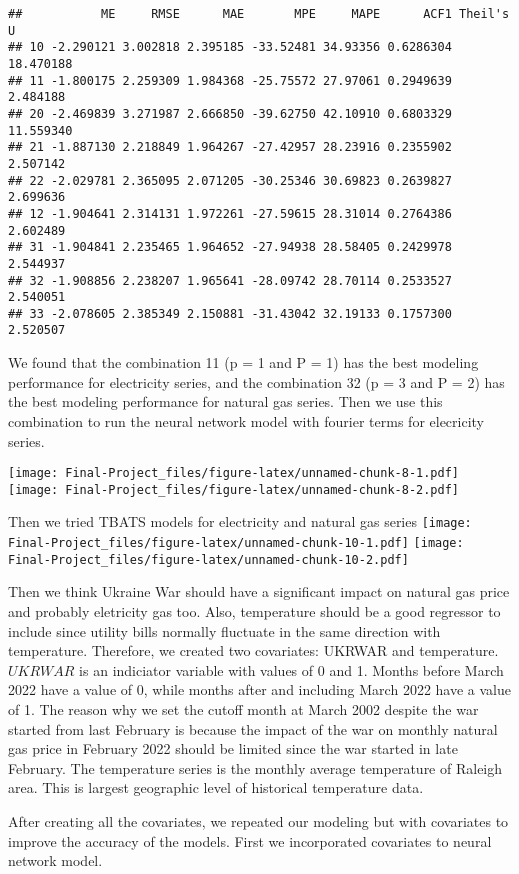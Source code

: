\documentclass[
]{article}
\begin{document}
\begin{verbatim}
##           ME     RMSE      MAE       MPE     MAPE      ACF1 Theil's U
## 10 -2.290121 3.002818 2.395185 -33.52481 34.93356 0.6286304 18.470188
## 11 -1.800175 2.259309 1.984368 -25.75572 27.97061 0.2949639  2.484188
## 20 -2.469839 3.271987 2.666850 -39.62750 42.10910 0.6803329 11.559340
## 21 -1.887130 2.218849 1.964267 -27.42957 28.23916 0.2355902  2.507142
## 22 -2.029781 2.365095 2.071205 -30.25346 30.69823 0.2639827  2.699636
## 12 -1.904641 2.314131 1.972261 -27.59615 28.31014 0.2764386  2.602489
## 31 -1.904841 2.235465 1.964652 -27.94938 28.58405 0.2429978  2.544937
## 32 -1.908856 2.238207 1.965641 -28.09742 28.70114 0.2533527  2.540051
## 33 -2.078605 2.385349 2.150881 -31.43042 32.19133 0.1757300  2.520507
\end{verbatim}

We found that the combination 11 (p = 1 and P = 1) has the best modeling
performance for electricity series, and the combination 32 (p = 3 and P
= 2) has the best modeling performance for natural gas series. Then we
use this combination to run the neural network model with fourier terms
for elecricity series.

\texttt{[image: Final-Project\_files/figure-latex/unnamed-chunk-8-1.pdf]}
\texttt{[image: Final-Project\_files/figure-latex/unnamed-chunk-8-2.pdf]}

Then we tried TBATS models for electricity and natural gas series
\texttt{[image: Final-Project\_files/figure-latex/unnamed-chunk-10-1.pdf]}
\texttt{[image: Final-Project\_files/figure-latex/unnamed-chunk-10-2.pdf]}

Then we think Ukraine War should have a significant impact on natural
gas price and probably eletricity gas too. Also, temperature should be a
good regressor to include since utility bills normally fluctuate in the
same direction with temperature. Therefore, we created two covariates:
UKRWAR and temperature. \(UKRWAR\) is an indiciator variable with values
of 0 and 1. Months before March 2022 have a value of 0, while months
after and including March 2022 have a value of 1. The reason why we set
the cutoff month at March 2002 despite the war started from last
February is because the impact of the war on monthly natural gas price
in February 2022 should be limited since the war started in late
February. The temperature series is the monthly average temperature of
Raleigh area. This is largest geographic level of historical temperature
data.

After creating all the covariates, we repeated our modeling but with
covariates to improve the accuracy of the models. First we incorporated
covariates to neural network model.
\end{document}
